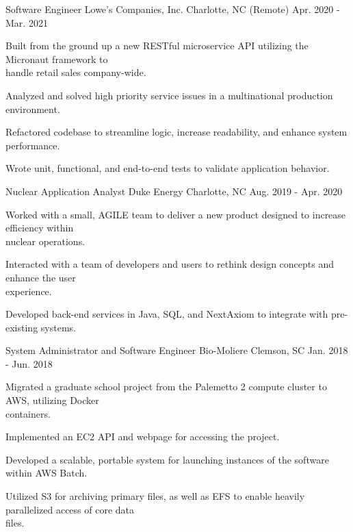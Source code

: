 \begin{cventries}
  \cventry
    {Software Engineer}
    {Lowe's Companies, Inc.}
    {Charlotte, NC (Remote)}
    {Apr. 2020 - Mar. 2021}
    {
        \begin{cvitems}
            \item {Built from the ground up a new RESTful microservice API utilizing the Micronaut framework to \\handle retail sales company-wide.}
            \item {Analyzed and solved high priority service issues in a multinational production environment.}
            \item {Refactored codebase to streamline logic, increase readability, and enhance system performance.}
            \item {Wrote unit, functional, and end-to-end tests to validate application behavior.}
        \end{cvitems}
    }
    
  \cventry
    {Nuclear Application Analyst}
    {Duke Energy}
    {Charlotte, NC}
    {Aug. 2019 - Apr. 2020}
    {
        \begin{cvitems}
            \item {Worked with a small, AGILE team to deliver a new product designed to increase efficiency within \\nuclear operations.}
            \item {Interacted with a team of developers and users to rethink design concepts and enhance the user \\experience.}
            \item {Developed back-end services in Java, SQL, and NextAxiom to integrate with pre-existing systems.}
        \end{cvitems}
    }
    
  \cventry
    {System Administrator and Software Engineer}
    {Bio-Moliere}
    {Clemson, SC}
    {Jan. 2018 - Jun. 2018}
    {
      \begin{cvitems}
        \item {Migrated a graduate school project from the Palemetto 2 compute cluster to AWS, utilizing Docker \\containers.}
        \item {Implemented an EC2 API and webpage for accessing the project.}
        \item {Developed a scalable, portable system for launching instances of the software within AWS Batch.}
        \item {Utilized S3 for archiving primary files, as well as EFS to enable heavily parallelized access of core data \\files.}
      \end{cvitems}
    }

\end{cventries}
